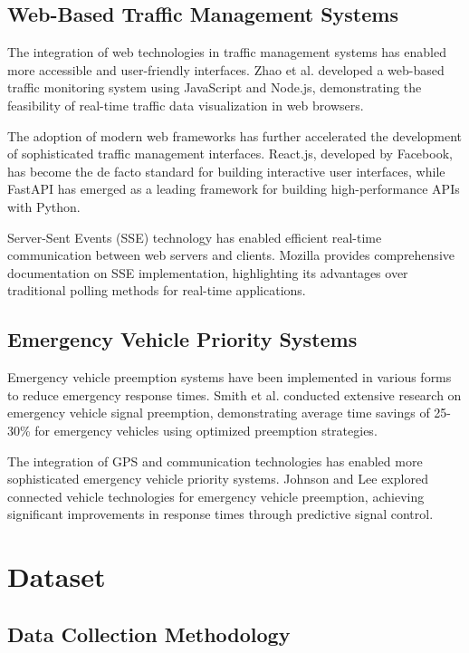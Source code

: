 \documentclass[conference]{IEEEtran}
\begin{document}
\subsection{Web-Based Traffic Management Systems}

The integration of web technologies in traffic management systems has enabled more accessible and user-friendly interfaces. Zhao et al. developed a web-based traffic monitoring system using JavaScript and Node.js, demonstrating the feasibility of real-time traffic data visualization in web browsers\cite{zhao2019web}.

The adoption of modern web frameworks has further accelerated the development of sophisticated traffic management interfaces. \cite{react2023}React.js, developed by Facebook, has become the de facto standard for building interactive user interfaces, while \cite{fastapi2023}FastAPI has emerged as a leading framework for building high-performance APIs with Python.

Server-Sent Events (SSE) technology has enabled efficient real-time communication between web servers and clients. \cite{mozilla2023sse}Mozilla provides comprehensive documentation on SSE implementation, highlighting its advantages over traditional polling methods for real-time applications.

\subsection{Emergency Vehicle Priority Systems}

Emergency vehicle preemption systems have been implemented in various forms to reduce emergency response times. Smith et al. conducted extensive research on emergency vehicle signal preemption, demonstrating average time savings of 25-30\% for emergency vehicles using optimized preemption strategies\cite{smith2005emergency}.

The integration of GPS and communication technologies has enabled more sophisticated emergency vehicle priority systems. Johnson and Lee explored connected vehicle technologies for emergency vehicle preemption, achieving significant improvements in response times through predictive signal control\cite{johnson2018connected}.

\section{Dataset}

\subsection{Data Collection Methodology}
\end{document}
